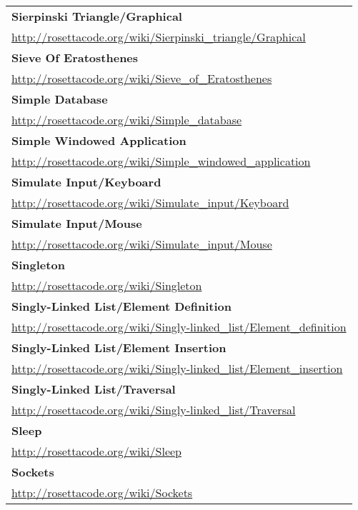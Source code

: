 \begin{longtable}{l}
\textbf{
Sierpinski Triangle/Graphical } \\ \href{http://rosettacode.org/wiki/Sierpinski\_triangle/Graphical}{http://rosettacode.org/wiki/Sierpinski\_triangle/Graphical} \\
\textbf{Sieve Of Eratosthenes } \\ \href{http://rosettacode.org/wiki/Sieve\_of\_Eratosthenes}{http://rosettacode.org/wiki/Sieve\_of\_Eratosthenes} \\
\textbf{
Simple Database } \\ \href{http://rosettacode.org/wiki/Simple\_database}{http://rosettacode.org/wiki/Simple\_database} \\
\textbf{Simple Windowed Application } \\ \href{http://rosettacode.org/wiki/Simple\_windowed\_application}{http://rosettacode.org/wiki/Simple\_windowed\_application} \\
\textbf{
Simulate Input/Keyboard } \\ \href{http://rosettacode.org/wiki/Simulate\_input/Keyboard}{http://rosettacode.org/wiki/Simulate\_input/Keyboard} \\
\textbf{Simulate Input/Mouse } \\ \href{http://rosettacode.org/wiki/Simulate\_input/Mouse}{http://rosettacode.org/wiki/Simulate\_input/Mouse} \\
\textbf{Singleton } \\ \href{http://rosettacode.org/wiki/Singleton}{http://rosettacode.org/wiki/Singleton} \\
\textbf{
Singly-Linked List/Element Definition } \\ \href{http://rosettacode.org/wiki/Singly-linked\_list/Element\_definition}{http://rosettacode.org/wiki/Singly-linked\_list/Element\_definition} \\
\textbf{
Singly-Linked List/Element Insertion } \\ \href{http://rosettacode.org/wiki/Singly-linked\_list/Element\_insertion}{http://rosettacode.org/wiki/Singly-linked\_list/Element\_insertion} \\
\textbf{Singly-Linked List/Traversal } \\ \href{http://rosettacode.org/wiki/Singly-linked\_list/Traversal}{http://rosettacode.org/wiki/Singly-linked\_list/Traversal} \\
\textbf{
Sleep } \\ \href{http://rosettacode.org/wiki/Sleep}{http://rosettacode.org/wiki/Sleep} \\
\textbf{Sockets } \\ \href{http://rosettacode.org/wiki/Sockets}{http://rosettacode.org/wiki/Sockets} \\

\end{longtable}
